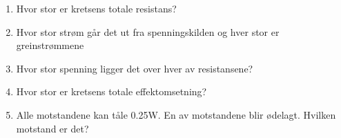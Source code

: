 \documentclass[12pt,a4paper]{article}
\begin{document}
\begin{enumerate}
\begin{enumerate}
\item Hvor stor er kretsens totale resistans?
\\
\item Hvor stor strøm går det ut fra spenningskilden og hver stor er greinstrømmene
\\
\item Hvor stor spenning ligger det over hver av resistansene?
\\
\item Hvor stor er kretsens totale effektomsetning?
\\
\item Alle motstandene kan tåle 0.25W. En av motstandene blir ødelagt. Hvilken
motstand er det?
\\
\end{enumerate}
%

\end{enumerate}
\end{document}
